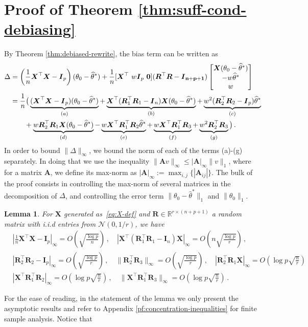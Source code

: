 \documentclass[11pt]{article}
\newtheorem{lemma}{Lemma}%
\newcommand{\bX}{\boldsymbol{X}}
\newcommand{\bI}{\boldsymbol{I}}
\newcommand{\bA}{\boldsymbol{A}}
\newcommand{\bR}{\boldsymbol{R}}
\newcommand{\mbR}{\mathbb{R}}
\newcommand{\mcN}{\mathcal{N}}
\newcommand{\hth}{\widehat{\theta}}
\begin{document}
\section{Proof of Theorem \ref{thm:suff-cond-debiasing}}\label{pf:suff-cond-debiasing}
By Theorem \ref{thm:debiased-rewrite}, the bias term can be written as
\begin{align}\label{eq:delta-expand}
    \Delta &=  \left(\frac{1}{n}\bX^\top \bX-\bI_p\right)(\theta_0-\hth^*)
        +\frac{1}{n}[\bX^\top\ w\bI_p\ \bf{0}](\bR^\top\bR-\bI_{n+p+1})\begin{bmatrix}\bX(\theta_0-\hth^*)\\ -w\hth^*\\ w\end{bmatrix}\nonumber\\
        &=\frac{1}{ n}\big(\underbrace{(\bX^\top \bX-\bI_p)(\theta_0-\hth^*)}_{(a)}
        +\underbrace{\bX^\top(\bR_1^\top \bR_1-\bI_n)\bX(\theta_0-\hth^*)}_{(b)}
        +\underbrace{w^2(\bR_2^\top \bR_2-\bI_p)\hth^*}_{(c)}\nonumber\\
        &\quad\quad+\underbrace{w\bR_2^\top \bR_1\bX(\theta_0-\hth^*)}_{(d)}
        -\underbrace{w\bX^\top \bR_1^\top \bR_2\hth^*}_{(e)}
        +\underbrace{w\bX^\top \bR_1^\top \bR_3}_{(f)}
        +\underbrace{w^2\bR_2^\top \bR_3}_{(g)}\big)\,.
\end{align}
In order to bound $\|\Delta\|_\infty$, we bound the norm of each of the terms (a)-(g) separately. In doing that we use the inequality $\|\bA v\|_\infty \le |\bA|_\infty \|v\|_1$, where for a matrix $\bA$, we define its max-norm as $|\bA|_\infty :=\max_{i,j}\{|\bA_{ij}|\}$. The bulk of the proof consists in controlling the max-norm of several matrices in the decomposition of $\Delta$, and controlling the error term $\|\theta_0-\hth^*\|_1$ and $\|\theta_0\|_1$.
\begin{lemma}\label{lem:concentration-inequalities}
    For $\bX$ generated as~\eqref{eq:X-def} and $\bR\in\mbR^{r\times (n+p+1)}$ a random matrix with i.i.d entries from $\mcN(0,1/r)$, we have
    \begin{align*}        
    &\left|\frac{1}{n}\bX^\top \bX-\bI_p\right|_\infty = O\left(\sqrt{\frac{\log p}{n}}\right)\,,\quad
    |\bX^\top(\bR_1^\top \bR_1-\bI_n)\bX|_\infty = O\left(n\sqrt{\frac{\log p}{r}}\right)\,,\\
    &|\bR_2^\top \bR_2-\bI_p|_\infty =O\left(\sqrt{\frac{\log p}{r}}\right)\,,\quad
    \|\bR_2^\top \bR_3\|_\infty =O\left(\sqrt{\frac{\log p}{r}}\right)\,,\quad
    |\bR_2^\top \bR_1\bX|_\infty =O\left(\log p\sqrt{\frac{n}{r}}\right)\\
    &|\bX^\top \bR_1^\top \bR_2|_\infty =O\left(\log p\sqrt{\frac{n}{r}}\right)\,,\quad 
    \|\bX^\top \bR_1^\top\bR_3\|_\infty =O\left(\log p\sqrt{\frac{n}{r}}\right)\,.
    \end{align*}
\end{lemma}
For the ease of reading, in the statement of the lemma we only present the asymptotic results and refer to Appendix \ref{pf:concentration-inequalities} for finite sample analysis. Notice that
\end{document}
